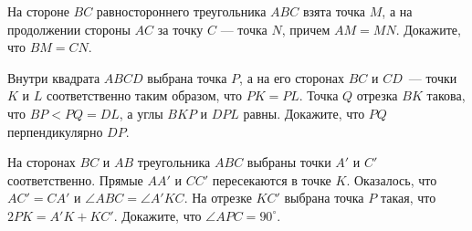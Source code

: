 \begin{problems}
\item На стороне $BC$ равностороннего треугольника $ABC$ взята точка $M$, а на продолжении стороны $AC$ за точку 
$C$ --- точка $N$, причем $AM=MN$. Докажите, что $BM=CN$.

\item Внутри квадрата $ABCD$ выбрана точка $P$, а на его сторонах $BC$ и $CD$~--- точки $K$ и $L$ соответственно таким образом, что $PK = PL$. Точка $Q$ отрезка $BK$ такова, что $BP < PQ = DL$, а углы $BKP$ и $DPL$ равны. Докажите, что $PQ$ перпендикулярно $DP$.

\item На сторонах $BC$ и $AB$ треугольника $ABC$ выбраны точки $A'$ и $C'$ соответственно. Прямые $AA'$ и $CC'$ пересекаются в точке $K$. Оказалось, что $AC'=CA'$ и $\angle ABC=\angle A'KC$. На отрезке $KC'$ выбрана точка $P$ такая, что $2PK=A'K+KC'$. Докажите, что $\angle APC=90^{\circ}$.

\end{problems}

\renewcommand{\baselinestretch}{1}
\parskip

